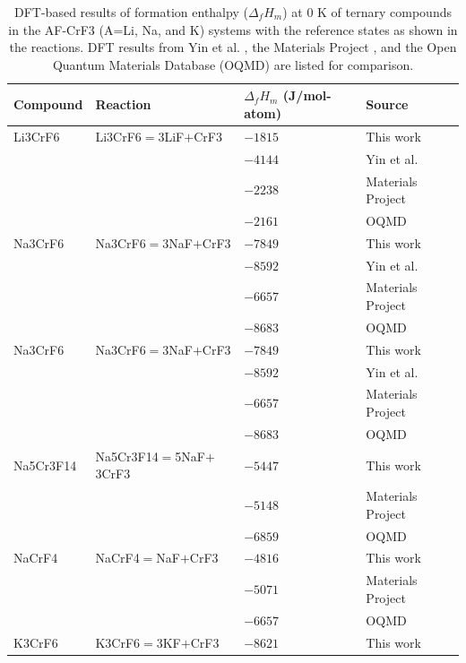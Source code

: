 \begin{table}[H]
    \centering
    \caption{DFT-based results of formation enthalpy ($\Delta_fH_m$) at 0 K of ternary compounds in the AF-CrF3 (A=Li, Na, and K) systems with the reference states as shown in the reactions. DFT results from Yin et al. \cite{yin2018thermodynamic, yin2014thermodynamic}, the Materials Project \cite{jain2013commentary}, and the Open Quantum Materials Database (OQMD) \cite{kirklin2015open} are listed for comparison.}
    \begin{tabular}{>{\raggedright\arraybackslash}m{2.5cm}>{\raggedright\arraybackslash}m{5cm}>{\raggedright\arraybackslash}m{3cm}>{\raggedright\arraybackslash}m{5cm}}
    \hline
    \textbf{Compound}&\textbf{Reaction}&\textbf{$\Delta_fH_m$ (J/mol-atom)}&\textbf{Source}\\
    \hline
    Li3CrF6&Li3CrF6$=$3LiF$+$CrF3&$-1815$&This work\\
    &&$-4144$&Yin et al. \cite{yin2014thermodynamic}\\
    &&$-2238$&Materials Project \cite{jain2013commentary}\\
    &&$-2161$&OQMD \cite{kirklin2015open}\\
    Na3CrF6&Na3CrF6$=$3NaF$+$CrF3&$-7849$&This work\\
	&&$-8592$&Yin et al. \cite{yin2018thermodynamic}\\
    &&$-6657$&Materials Project \cite{jain2013commentary}\\
    &&$-8683$&OQMD \cite{kirklin2015open}\\
    Na3CrF6&Na3CrF6$=$3NaF$+$CrF3&$-7849$&This work\\
	&&$-8592$&Yin et al. \cite{yin2018thermodynamic}\\
    &&$-6657$&Materials Project  \cite{jain2013commentary}\\
    &&$-8683$&OQMD \cite{kirklin2015open}\\
    Na5Cr3F14&Na5Cr3F14$=$5NaF$+$3CrF3&$-5447$&This work\\
	&&$-5148$&Materials Project \cite{jain2013commentary}\\
	&&$-6859$&OQMD \cite{kirklin2015open}\\
    NaCrF4&NaCrF4$=$NaF$+$CrF3&$-4816$&This work\\
    &&$-5071$&Materials Project \cite{jain2013commentary}\\
	&&$-6657$&OQMD \cite{kirklin2015open}\\
    K3CrF6&K3CrF6$=$3KF$+$CrF3&$-8621$&This work\\

\end{tabular}
\end{table}
